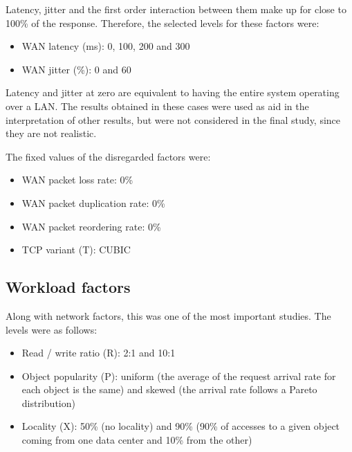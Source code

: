 \documentclass[man,floatsintext,12pt]{apa6}
\begin{document}
Latency, jitter and the first order interaction between them make up for close to 100\% of the response. Therefore, the selected levels for
these factors were:

\begin{itemize}

\item WAN latency (ms): 0, 100, 200 and 300

\item WAN jitter (\%): 0 and 60

\end{itemize}

Latency and jitter at zero are equivalent to having the entire system operating
over a LAN. The results obtained in these cases were used as aid in the
interpretation of other results, but were not considered in the final study,
since they are not realistic.

The fixed values of the disregarded factors were:

\begin{itemize}

\item WAN packet loss rate: 0\%

\item WAN packet duplication rate: 0\%

\item WAN packet reordering rate: 0\%

\item TCP variant (T): CUBIC

\end{itemize}

\subsection{Workload factors}

Along with network factors, this was one of the most important studies. The
levels were as follows:

\begin{itemize}

\item Read / write ratio (R): 2:1 and 10:1

\item Object popularity (P): uniform (the average of the request arrival rate
for each object is the same) and skewed (the arrival rate follows a Pareto
distribution)

\item Locality (X): 50\% (no locality) and 90\% (90\% of accesses to a given
object coming from one data center and 10\% from the other)

\end{itemize}
\end{document}
